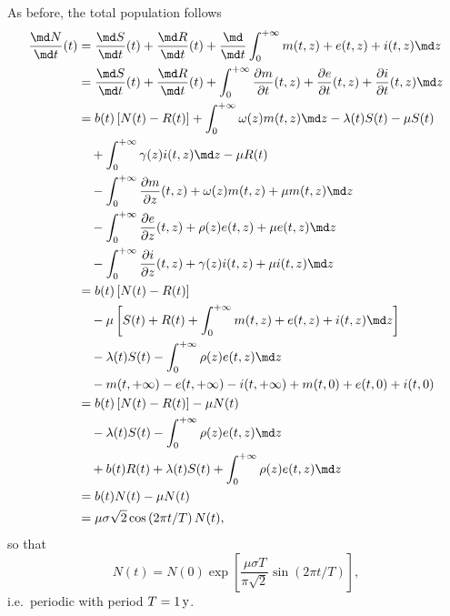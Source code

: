 \documentclass{jpmarticle}
\begin{document}
As before, the total population follows
\begin{equation}
  \begin{split}
    \frac{\md N}{\md t}(t)
    &= \frac{\md S}{\md t}(t)
    + \frac{\md R}{\md t}(t)
    + \frac{\md}{\md t} \int_0^{+\infty} m(t, z) + e(t, z) + i(t, z) \md z
    \\
    &= \frac{\md S}{\md t}(t)
    + \frac{\md R}{\md t}(t)
    + \int_0^{+\infty} \frac{\partial m}{\partial t}(t, z)
    + \frac{\partial e}{\partial t}(t, z)
    + \frac{\partial i}{\partial t}(t, z) \md z
    \\
    &=
    b(t) \left[N(t) - R(t)\right]
    + \int_0^{+\infty} \omega(z) m(t, z) \md z
    - \lambda(t) S(t) - \mu S(t)
    \\ & \quad {}
    + \int_0^{+\infty} \gamma(z) i(t, z) \md z
    - \mu R(t)
    \\ & \quad {}
    - \int_0^{+\infty}
    \frac{\partial m}{\partial z}(t, z)
    + \omega(z) m(t, z)
    + \mu m(t, z)
    \md z
    \\ & \quad {}
    - \int_0^{+\infty}
    \frac{\partial e}{\partial z}(t, z)
    + \rho(z) e(t, z)
    + \mu e(t, z)
    \md z
    \\ & \quad {}
    - \int_0^{+\infty}
    \frac{\partial i}{\partial z}(t, z)
    + \gamma(z) i(t, z)
    + \mu i(t, z)
    \md z
    \\
    &=
    b(t) \left[N(t) - R(t)\right]
    \\ & \quad {}
    - \mu \left[
      S(t) + R(t)
      + \int_0^{+\infty}
      m(t, z) + e(t, z) + i(t, z)
      \md z
    \right]
    \\ & \quad {}
    - \lambda(t) S(t)
    - \int_0^{+\infty}
    \rho(z) e(t, z)
    \md z
    \\ & \quad {}
    - m(t, +\infty) - e(t, +\infty) - i(t, +\infty)
    + m(t, 0) + e(t, 0) + i(t, 0)
    \\
    &=
    b(t) \left[N(t) - R(t)\right]
    - \mu N(t)
    \\ & \quad {}
    - \lambda(t) S(t)
    - \int_0^{+\infty}
    \rho(z) e(t, z)
    \md z
    \\ & \quad {}
    + b(t) R(t)
    + \lambda(t) S(t)
    + \int_0^{+\infty} \rho(z) e(t, z) \md z
    \\
    &= b(t) N(t) - \mu N(t)
    \\
    &= \mu \sigma \sqrt{2} \cos\left(2 \pi t / T\right) N(t),
  \end{split}
\end{equation}
so that
\begin{equation}
  N(t) = N(0) \exp\left[
    \frac{\mu \sigma T}{\pi \sqrt{2}}
    \sin\left(2 \pi t / T\right)
  \right],
\end{equation}
i.e.~periodic with period $T = \unit[1]{y}$.
\end{document}
